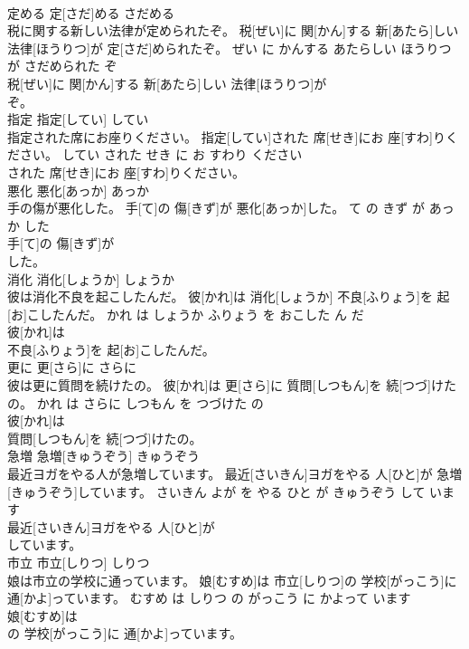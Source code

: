 \documentclass[8pt]{extreport}
\begin{document}
\begin{CJK}{UTF8}{min}
\\	定める	定[さだ]める	さだめる	
\\	税に関する新しい法律が定められたぞ。	税[ぜい]に 関[かん]する 新[あたら]しい 法律[ほうりつ]が 定[さだ]められたぞ。	ぜい に かんする あたらしい ほうりつ が さだめられた ぞ	
\\	税[ぜい]に 関[かん]する 新[あたら]しい 法律[ほうりつ]が
\\	ぞ。			
\\	指定	指定[してい]	してい	
\\	指定された席にお座りください。	指定[してい]された 席[せき]にお 座[すわ]りください。	してい された せき に お すわり ください	
\\	された 席[せき]にお 座[すわ]りください。			
\\	悪化	悪化[あっか]	あっか	
\\	手の傷が悪化した。	手[て]の 傷[きず]が 悪化[あっか]した。	て の きず が あっか した	
\\	手[て]の 傷[きず]が
\\	した。			
\\	消化	消化[しょうか]	しょうか	
\\	彼は消化不良を起こしたんだ。	彼[かれ]は 消化[しょうか] 不良[ふりょう]を 起[お]こしたんだ。	かれ は しょうか ふりょう を おこした ん だ	
\\	彼[かれ]は
\\	不良[ふりょう]を 起[お]こしたんだ。			
\\	更に	更[さら]に	さらに	
\\	彼は更に質問を続けたの。	彼[かれ]は 更[さら]に 質問[しつもん]を 続[つづ]けたの。	かれ は さらに しつもん を つづけた の	
\\	彼[かれ]は
\\	質問[しつもん]を 続[つづ]けたの。			
\\	急増	急増[きゅうぞう]	きゅうぞう	
\\	最近ヨガをやる人が急増しています。	最近[さいきん]ヨガをやる 人[ひと]が 急増[きゅうぞう]しています。	さいきん よが を やる ひと が きゅうぞう して います	
\\	最近[さいきん]ヨガをやる 人[ひと]が
\\	しています。			
\\	市立	市立[しりつ]	しりつ	
\\	娘は市立の学校に通っています。	娘[むすめ]は 市立[しりつ]の 学校[がっこう]に 通[かよ]っています。	むすめ は しりつ の がっこう に かよって います	
\\	娘[むすめ]は
\\	の 学校[がっこう]に 通[かよ]っています。			

\end{CJK}
\end{document}
